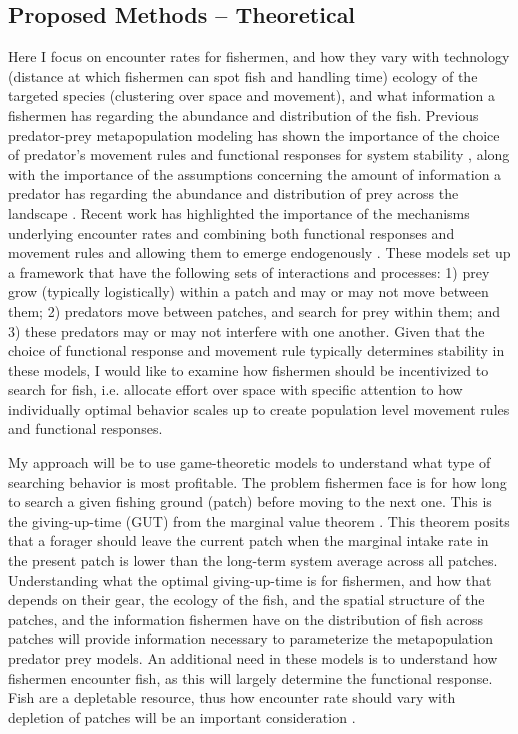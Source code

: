 \documentclass[12pt,a4paper]{report}
\begin{document}
\subsection{Proposed Methods -- Theoretical}
Here I focus on encounter rates for fishermen, and how they vary with technology (distance at which fishermen can spot fish and handling time) ecology of the targeted species (clustering over space and movement), and what information a fishermen has regarding the abundance and distribution of the fish. Previous predator-prey metapopulation modeling has shown the importance of the choice of predator's movement rules and functional responses for system stability \citep{Bernsteinetal:1999}, along with the importance of the assumptions concerning the amount of information a predator has regarding the abundance and distribution of prey across the landscape \citep{Morozovetal:2012, Abramsetal:2011, Ruokolainenetal:2011, Anderson:2010, Abrams:2010, Matsumuraetal:2010}. Recent work has highlighted the importance of the mechanisms underlying encounter rates and combining both functional responses and movement rules and allowing them to emerge endogenously \citep{Anderson:2010, Gurarieetal:2013}. These models set up a framework that have the following sets of interactions and processes: 1) prey grow (typically logistically) within a patch and may or may not move between them; 2) predators move between patches, and search for prey within them; and 3) these predators may or may not interfere with one another. Given that the choice of functional response and movement rule typically determines stability in these models, I would like to examine how fishermen should be incentivized to search for fish, i.e. allocate effort over space with specific attention to how individually optimal behavior scales up to create population level movement rules and functional responses. 

My approach will be to use game-theoretic models to understand what type of searching behavior is most profitable. The problem fishermen face is for how long to search a given fishing ground (patch) before moving to the next one.  This is the giving-up-time (GUT) from the marginal value theorem \citep{Charnov:1976}. This theorem posits that a forager should leave the current patch when the marginal intake rate in the present patch is lower than the long-term system average across all patches. Understanding what the optimal giving-up-time is for fishermen, and how that depends on their gear, the ecology of the fish, and the spatial structure of the patches, and the information fishermen have on the distribution of fish across patches will provide information necessary to parameterize the metapopulation predator prey models. An additional need in these models is to understand how fishermen encounter fish, as this will largely determine the functional response. Fish are a depletable resource, thus how encounter rate should vary with depletion of patches will be an important consideration \citep{Gurarieetal:2013, MorozovPoggiale:2012, Anderson:2010, HutchinsonWaser:2007}. 
\end{document}
